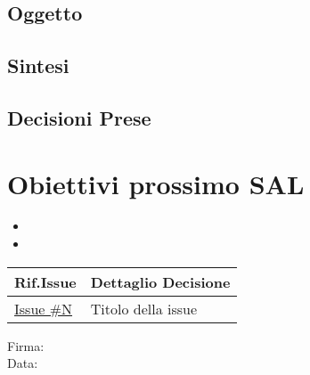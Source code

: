 \documentclass[10pt]{article}
\begin{document}
\subsection{Oggetto}

\subsection{Sintesi}

\subsection{Decisioni Prese}

\section{Obiettivi prossimo SAL} 
    \begin{itemize}
            \item
            \item
    \end{itemize}
    \begin{center}
    \begin{tabular}{|>{\centering\arraybackslash}m{3cm}|>{\centering\arraybackslash}m{12cm}|}
	\hline
	\textbf{Rif.Issue} & \textbf{Dettaglio Decisione}\\
	\hline
            \href{}{Issue \#N} & Titolo della issue\\
        \hline
    \end{tabular}
    \end{center}

\vfill
\begin{minipage}{10cm}
Firma: \hrulefill \\
\vspace{2mm}
Data: \dotfill
\end{minipage}
\end{document}
